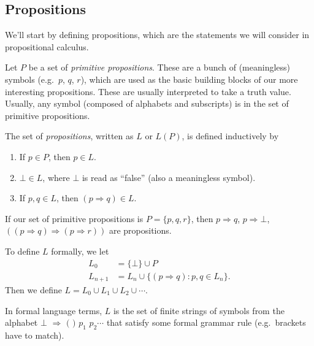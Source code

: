 \documentclass[a4paper]{article}
\begin{document}
\subsection{Propositions}
We'll start by defining propositions, which are the statements we will consider in propositional calculus.
\begin{defi}[Propositions]
  Let $P$ be a set of \emph{primitive propositions}. These are a bunch of (meaningless) symbols (e.g.\ $p$, $q$, $r$), which are used as the basic building blocks of our more interesting propositions. These are usually interpreted to take a truth value. Usually, any symbol (composed of alphabets and subscripts) is in the set of primitive propositions.

  The set of \emph{propositions}, written as $L$ or $L(P)$, is defined inductively by
  \begin{enumerate}
    \item If $p\in P$, then $p\in L$.
    \item $\bot\in L$, where $\bot$ is read as ``false'' (also a meaningless symbol).
    \item If $p, q\in L$, then $(p\Rightarrow q)\in L$.
  \end{enumerate}
\end{defi}

\begin{eg}
  If our set of primitive propositions is $P = \{p, q, r\}$, then $p\Rightarrow q$, $p\Rightarrow \bot$, $((p\Rightarrow q)\Rightarrow (p\Rightarrow r))$ are propositions.
\end{eg}

To define $L$ formally, we let
\begin{align*}
  L_0 &= \{\bot\}\cup P\\
  L_{n + 1} &= L_n\cup \{(p\Rightarrow q): p, q\in L_n\}.
\end{align*}
Then we define $L = L_0 \cup L_1\cup L_2\cup \cdots$.

In formal language terms, $L$ is the set of finite strings of symbols from the alphabet $\bot$ $\Rightarrow $ $($ $)$ $p_1$ $p_2 \cdots$ that satisfy some formal grammar rule (e.g.\ brackets have to match).
\end{document}
